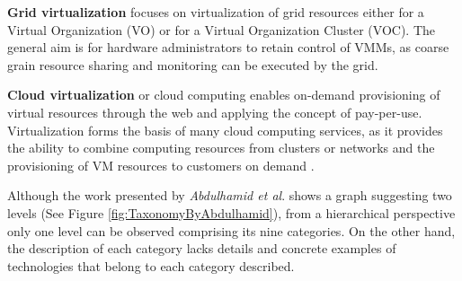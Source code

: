 	\textbf{Grid virtualization} focuses on virtualization of grid resources either for a Virtual Organization (VO) or for a Virtual Organization Cluster (VOC). The general aim is for hardware administrators to retain control of VMMs, as coarse grain resource sharing and monitoring can be executed by the grid.
	
	\textbf{Cloud virtualization} or cloud computing enables on-demand provisioning of virtual resources through the web and applying the concept of pay-per-use. Virtualization forms the basis of many cloud computing services, as it provides the ability to combine computing resources from clusters or networks and the provisioning of VM resources to customers on demand \cite{Abdulhamid2014, Aceto2013}.
	
	
	Although the work presented by \textit{Abdulhamid et al}. \cite{Abdulhamid2014} shows a graph suggesting two levels (See Figure \ref{fig:TaxonomyByAbdulhamid}), from a hierarchical perspective only one level can be observed comprising its nine categories. On the other hand, the description of each category lacks details and concrete examples of technologies that belong to each category described. 
	
	
